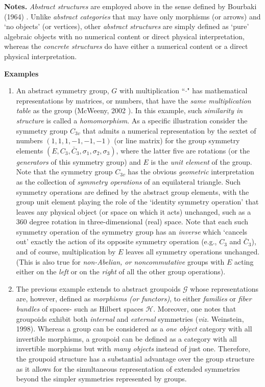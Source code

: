 \documentclass[12pt]{article}
\theoremstyle{plain}
\theoremstyle{definition}
\numberwithin{equation}{section}
\renewcommand{\H}{\mathcal H}
\newcommand{\grp}{\mathcal G}
\newcommand{\<}{{\langle}}
\begin{document}
\textbf{Notes.} \emph{Abstract structures} are employed above in the sense defined by Bourbaki (1964) \cite{NB64}.
Unlike \emph{abstract categories} that may have only morphisms (or arrows) and `no objects'
(or vertices), other \emph{abstract structures} are simply defined as `pure' algebraic objects with
no numerical content or direct physical interpretation, whereas the \emph{concrete structures} do have
either a numerical content or a direct physical interpretation.


\textbf{Examples}
\begin{enumerate}

\item  An abstract symmetry group, $G$ with multiplication ``$\cdot$" has mathematical representations by matrices, or numbers, that have the \emph{same multiplication table} as the group (McWeeny, 2002 \cite{RMcW2k2}). In this example, such \emph{similarity in structure} is called a \emph{homomorphism}.  As a specific illustration consider the symmetry group $C_{3v}$ that admits a numerical representation by the sextet of numbers $(1,1,1,-1,-1,-1)$ (or line matrix)
for the group symmetry elements $(E, C_3, \bar{C}_3, \sigma_1, \sigma_2, \sigma_3)$, where the latter
five are rotations (or the \emph{generators} of this symmetry group) and $E$ is the \emph{unit element} of the
group. Note that the symmetry group $C_{3v}$ has the obvious \emph{geometric} interpretation as the 
collection of \emph{symmetry operations} of an equilateral triangle. Such symmetry operations are defined by
the abstract group elements, with the group unit element playing the role of the `identity symmetry operation'
that leaves any physical object (or space on which it acts) unchanged, such as a $360$ degree rotation in three-dimensional (real) space. Note that each such symmetry operation of the symmetry group has an \emph{inverse} which `cancels out' exactly the action of its opposite symmetry operation (e.g., $C_3$ and $\bar{C}_3$),
and of course, multiplication by $E$ leaves all symmetry operations unchanged. (This is also true for \emph{non-Abelian, or noncommutative} groups with $E$ acting either on the \emph{left} or on the \emph{right} of all the other group operations). 

\item The previous example extends to abstract groupoids $\grp$ whose representations are, however, defined as 
\emph{morphisms (or functors)}, to either \emph{families} or \emph{fiber bundles} of spaces- such as Hilbert spaces $\H$. Moreover, one notes that groupoids exhibit both \emph{internal} and \emph{external} symmetries 
(\emph{viz.} Weinstein, 1998). Whereas a group can be considered as a \emph{one object} category with all invertible 
morphisms, a groupoid can be defined as a category with all invertible morphisms but with \emph{many objects} instead of just one. Therefore, the groupoid structure has a substantial advantage over the group structure
as it allows for the simultaneous representation of extended symmetries beyond the simpler symmetries represented by groups. 


\end{enumerate}
\end{document}
